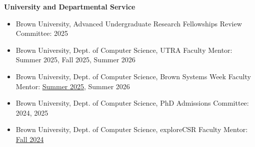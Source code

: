 \noindent\hspace{1cm}
\textbf{University and Departmental Service}
\begin{itemize}[leftmargin=1.5cm]\setlength{\itemsep}{0pt}
  \item Brown University, Advanced Undergraduate Research Fellowships Review Committee: 2025
  \item Brown University, Dept. of Computer Science, UTRA Faculty Mentor: Summer 2025, Fall 2025, Summer 2026
  \item Brown University, Dept. of Computer Science, Brown Systems Week Faculty Mentor: \href{brown-systems-week.github.io}{Summer 2025}, Summer 2026
  \item Brown University, Dept. of Computer Science, PhD Admissions Committee: 2024, 2025
  \item Brown University, Dept. of Computer Science, exploreCSR Faculty Mentor: \href{https://explorecsr.cs.brown.edu/systems/index.html}{Fall 2024}
\end{itemize}
